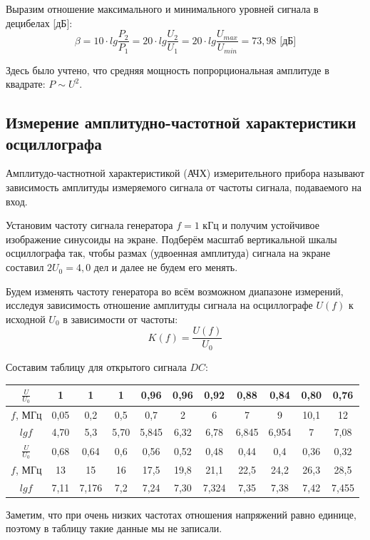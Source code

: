 \documentclass[a4paper, 12pt]{article} %
\begin{document}
Выразим отношение максимального и минимального уровней сигнала в децибелах [дБ]:
\[\beta = 10 \cdot lg \frac{P_2}{P_1} = 20 \cdot lg \frac{U_2}{U_1} = 20 \cdot lg \frac{U_{max}}{U_{min}} = 73,98 \text{ [дБ]}\]

Здесь было учтено, что средняя мощность попрорциональная амплитуде в квадрате: $P\sim U^2$.

\subsection{Измерение амплитудно-частотной характеристики осциллографа}

Амплитудо-частнотной характеристикой (АЧХ) измерительного прибора называют зависимость амплитуды измеряемого
сигнала от частоты сигнала, подаваемого на вход.

Установим частоту сигнала генератора $f = 1$ кГц и получим
устойчивое изображение синусоиды на экране. Подберём масштаб вертикальной шкалы осциллографа так, чтобы размах (удвоенная амплитуда) сигнала на
экране составил $2U_0 = 4,0$ дел и далее не будем его менять.

Будем изменять частоту генератора во всём возможном диапазоне измерений, исследуя зависимость отношение амплитуды сигнала на осциллографе $U(f)$ к исходной $U_0$ в зависимости от частоты:
\[K(f) = \frac{U(f)}{U_0}\]
 
Составим таблицу для открытого сигнала $DC$:
\begin{center}
\begin{tabular}{|c|c|c|c|c|c|c|c|c|c|c|}
 \hline 
 $\frac{U}{U_0}$ & 1 & 1 & 1 & 0,96 & 0,96 & 0,92 & 0,88 & 0,84 & 0,80 & 0,76 \\ 
 \hline 
 $f$, МГц & 0,05 & 0,2 & 0,5 & 0,7 & 2 & 6 & 7 & 9 & 10,1 & 12 \\
 \hline 
 $lgf$ & 4,70 & 5,3 & 5,70 & 5,845 & 6,32 & 6,78 & 6,845 & 6,954 & 7 & 7,08 \\  
 \hline 
 $\frac{U}{U_0}$ & 0,68 & 0,64 & 0,6 & 0,56 & 0,52 & 0,48 & 0,44 & 0,4 & 0,36 & 0,32 \\ 
 \hline 
 $f$, МГц & 13 & 15 & 16 & 17,5 & 19,8 & 21,1 & 22,5 & 24,2 & 26,3 & 28,5 \\ 
 \hline
 $lgf$ & 7,11 & 7,176 & 7,2 & 7,24 & 7,30 & 7,324 & 7,35 & 7,38 & 7,42 & 7,455 \\  
 \hline  
\end{tabular}
\end{center}
  
Заметим, что при очень низких частотах отношения напряжений равно единице, поэтому в таблицу такие данные мы не записали. 
\end{document}
